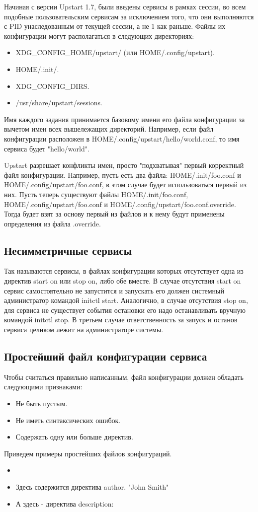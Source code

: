 Начиная с версии Upstart 1.7, были введены сервисы в рамках сессии, во всем подобные пользовательским сервисам за исключением того, что они выполняются с PID унаследованным от текущей сессии, а не 1 как
раньше. 
Файлы их конфигурации могут располагаться в следующих директориях: \begin{itemize}
\item \textdollar XDG\_CONFIG\_HOME/upstart/ (или \textdollar HOME/.config/upstart).
\item \textdollar HOME/.init/.
\item \textdollar XDG\_CONFIG\_DIRS.
\item /usr/share/upstart/sessions.
\end{itemize}
Имя каждого задания принимается базовому имени его файла конфигурации за вычетом имен всех вышележащих директорий. Например, если файл конфигурации расположен в \textdollar HOME/.config/upstart/hello/world.conf, то имя сервиса будет "hello/world".

Upstart разрешает конфликты имен, просто "подхватывая" первый корректный файл конфигурации. Например, пусть есть два файла: \textdollar HOME/.init/foo.conf и \textdollar HOME/.config/upstart/foo.conf, 
в этом случае будет использоваться первый из них. Пусть теперь существуют файлы \textdollar HOME/.init/foo.conf, \textdollar HOME/.config/upstart/foo.conf и \textdollar HOME/.config/upstart/foo.conf.override. Тогда будет взят за основу первый из файлов и к нему будут применены определения из файла .override.
\subsection{Несимметричные сервисы}
Так называются сервисы, в файлах конфигурации которых отсутствует одна из директив start on или stop on, либо обе вместе. В случае отсутствия start on сервис самостоятельно не запустится и запускать его должен системный администратор командой initctl start. Аналогично, в случае отсутствия stop on, для сервиса не существует события остановки его надо останавливать вручную командой initctl stop. В третьем случае ответственность за запуск и останов сервиса целиком лежит на администраторе системы.
\subsection{Простейший файл конфигурации сервиса}
Чтобы считаться правильно написанным, файл конфигурации должен обладать следующими признаками: \begin{itemize}
\item Не быть пустым.
\item Не иметь синтаксических ошибок.
\item Содержать одну или больше директив.
\end{itemize}
Приведем примеры простейших файлов конфигураций. 
\begin{itemize}
\item {}
\item Здесь содержится директива author.  {"John Smith"}  
\item А здесь - директива description:  
\end{itemize}
